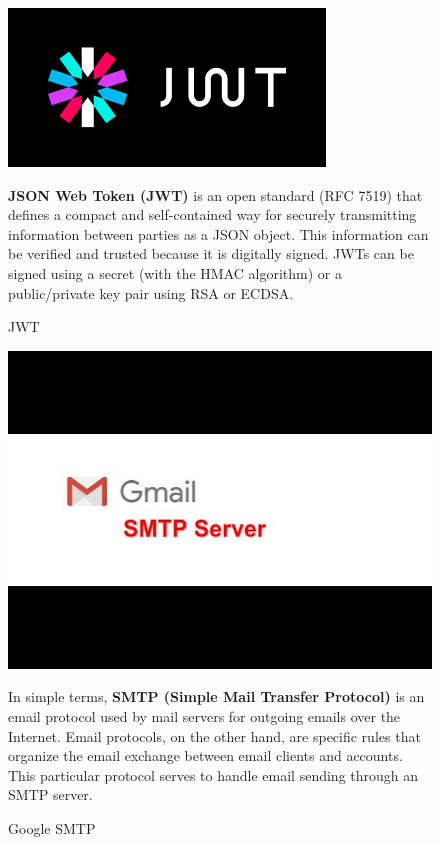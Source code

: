 \begin{figure}[h]
\centering
\begin{minipage}{0.3\textwidth}
    \centering
    \includegraphics[width=\linewidth,frame]{figures/jwt.png}
    \caption{JWT}
\end{minipage}
\hfill
\begin{minipage}{0.6\textwidth}
\textbf{JSON Web Token (JWT)} is an open standard (RFC 7519) that defines a compact and self-contained way for securely transmitting information between parties as a JSON object. This information can be verified and trusted because it is digitally signed. JWTs can be signed using a secret (with the HMAC algorithm) or a public/private key pair using RSA or ECDSA.\cite{samplewebs22}
\end{minipage}
\end{figure}

\begin{figure}[h]
\centering
\begin{minipage}{0.3\textwidth}
    \centering
    \includegraphics[width=\linewidth,frame]{figures/smtp.jpg}
    \caption{Google SMTP}
\end{minipage}
\hfill
\begin{minipage}{0.6\textwidth}
In simple terms, \textbf{SMTP (Simple Mail Transfer Protocol)} is an email protocol used by mail servers for outgoing emails over the Internet. Email protocols, on the other hand, are specific rules that organize the email exchange between email clients and accounts. This particular protocol serves to handle email sending through an SMTP server.\cite{samplewebs23}
\end{minipage}
\end{figure}

